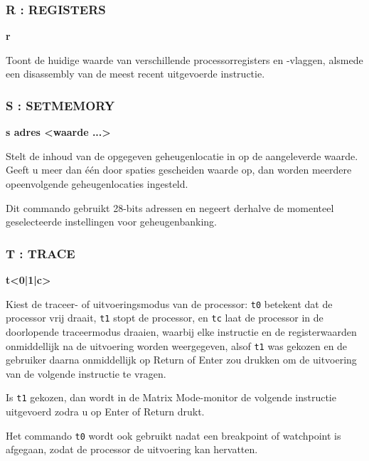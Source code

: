 \subsubsection{R : REGISTERS}
\begin{description}[leftmargin=2cm,style=nextline]
\item [Formaat:] {\bf r}\item [Gebruik:] Toont de huidige waarde van verschillende processorregisters en -vlaggen, alsmede een disassembly van de meest recent uitgevoerde instructie.

\end{description}

\subsubsection{S : SETMEMORY}
\begin{description}[leftmargin=2cm,style=nextline]
\item [Formaat:] {\bf s adres <waarde ...>}\item [Gebruik:] Stelt de inhoud van de opgegeven geheugenlocatie in op de aangeleverde waarde. Geeft u meer dan één door spaties gescheiden waarde op, dan worden meerdere opeenvolgende geheugenlocaties ingesteld.

  Dit commando gebruikt 28-bits adressen en negeert derhalve de momenteel geselecteerde instellingen voor geheugenbanking.

\end{description}


\subsubsection{T : TRACE}
\begin{description}[leftmargin=2cm,style=nextline]
\item [Formaat:] {\bf t<0|1|c>}\item [Gebruik:] Kiest de traceer- of uitvoeringsmodus van de processor: {\tt t0} betekent dat de processor vrij draait, {\tt t1} stopt de processor, en {\tt tc} laat de processor in de doorlopende traceermodus draaien, waarbij elke instructie en de registerwaarden onmiddellijk na de uitvoering worden weergegeven, alsof {\tt t1} was gekozen en de gebruiker daarna onmiddellijk op Return of Enter zou drukken om de uitvoering van de volgende instructie te vragen.

  Is {\tt t1} gekozen, dan wordt in de Matrix Mode-monitor de volgende instructie uitgevoerd zodra u op Enter of Return drukt.

  Het commando {\tt t0} wordt ook gebruikt nadat een breakpoint of watchpoint is afgegaan, zodat de processor de uitvoering kan hervatten.

\end{description}

